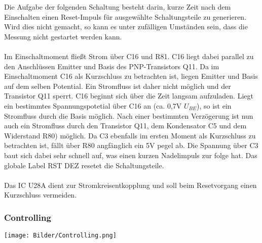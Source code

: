 \documentclass[a4paper,11pt]{scrartcl}
\begin{document}
Die Aufgabe der folgenden Schaltung besteht darin, kurze Zeit nach dem Einschalten einen Reset-Impuls für ausgewählte Schaltungsteile zu generieren. Wird dies nicht gemacht, so kann es unter zufälligen Umständen sein, dass die Messung nicht gestartet werden kann.
\\
\\
Im Einschaltmoment fließt Strom über C16 und R81. C16 liegt dabei parallel zu den Anschlüssen \glqq Emitter und Basis\grqq{} des PNP-Transistors Q11. Da im Einschaltmoment C16 als Kurzschluss zu betrachten ist, liegen Emitter und Basis auf dem selben Potential. Ein Stromfluss ist daher nicht möglich und der Transistor Q11 sperrt. C16 beginnt sich über die Zeit langsam aufzuladen. Liegt ein bestimmtes Spannungspotetial über C16 an (ca. 0,7V $U_{BE}$), so ist ein Stromfluss durch die Basis möglich. Nach einer bestimmten Verzögerung ist nun auch ein Stromfluss durch den Transistor Q11, dem Kondensator C5 und dem Widerstand R80) möglich. Da C3 ebenfalls im ersten Moment als Kurzschluss zu betrachten ist, fällt über R80 angfänglich ein 5V pegel ab. Die Spannung über C3 baut sich dabei sehr schnell auf, was einen kurzen Nadelimpuls zur folge hat. Das globale Label \glqq RST DEZ\grqq{} resetet die Schaltungsteile.  
\\
\\
Das IC U28A dient zur Stromkreisentkopplung und soll beim Resetvorgang einen Kurzschluss vermeiden.

\newpage
\subsubsection{Controlling}

\begin{center}
\texttt{[image: Bilder/Controlling.png]}
\end{center}
\end{document}
